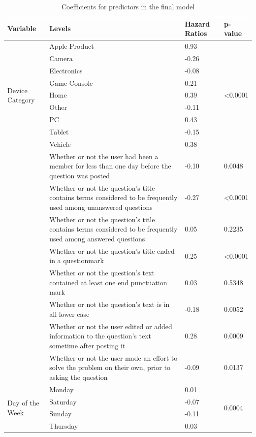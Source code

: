 \documentclass{article}
\begin{document}
\begin{table}[!htbp]
\centering
\caption{Coefficients for predictors in the final model} 
\begin{tabular}{|p{1.5cm}|p{6cm}|p{2.5cm}|p{2.5cm}|}
  \hline
 Variable &  Levels & Hazard Ratios & p-value \\ 
  \hline
  \multirow{ 9 }{ 2 cm }{ Device Category } & Apple Product & 0.93 & \multirow{ 9 }{ 1.5cm }{ <0.0001 }\\ 
  & Camera & -0.26 & \\ 
  & Electronics & -0.08 &\\ 
  & Game Console & 0.21 &\\ 
  & Home & 0.39 &\\ 
  & Other & -0.11 &\\ 
  & PC & 0.43 &\\ 
  & Tablet & -0.15 &\\ 
  & Vehicle & 0.38 &\\
  \hline
  & Whether or not the user had been a member for less than one day before the question was posted & -0.10 & 0.0048 \\
  \hline
  & Whether or not the question's title contains terms considered to be frequently used among unanswered questions & -0.27 & <0.0001 \\ 
  \hline
  & Whether or not the question's title contains terms considered to be frequently used among answered questions & 0.05 & 0.2235\\ 
  \hline
  & Whether or not the question's title ended in a questionmark & 0.25 & <0.0001\\ 
  \hline
  & Whether or not the question's text contained at least one end punctuation mark & 0.03 & 0.5348\\ 
  \hline
  & Whether or not the question's text is in all lower case & -0.18 & 0.0052 \\ 
  \hline
  & Whether or not the user edited or added information to the question's text sometime after posting it & 0.28 & 0.0009 \\ 
  \hline
  & Whether or not the user made an effort to solve the problem on their own, prior to asking the question & -0.09 & 0.0137 \\ 
  \hline
  \multirow{ 6 }{ 2 cm }{ Day of the Week } & Monday & 0.01 & \multirow{ 6 }{ 1.5cm }{ 0.0004 }\\ 
  & Saturday & -0.07 & \\ 
  & Sunday & -0.11 & \\ 
  & Thursday & 0.03 & \\ 

\end{tabular}
\end{table}
\end{document}

